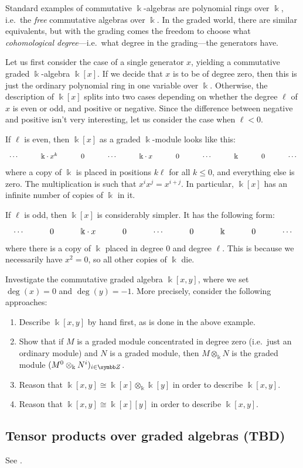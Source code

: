 \begin{example}
	Standard examples of commutative \(\Bbbk\)-algebras are polynomial rings over \(\Bbbk\), i.e.\ the \emph{free} commutative algebras over \(\Bbbk\).
	In the graded world, there are similar equivalents, but with the grading comes the freedom to choose what \emph{cohomological degree}---i.e.\ what degree in the grading---the generators
	have.

	Let us first consider the case of a single generator \(x\), yielding a commutative graded \(\Bbbk\)-algebra \(\Bbbk[x]\). If we decide that \(x\) is to be of degree zero,
	then this is just the ordinary polynomial ring in one variable over \(\Bbbk\). Otherwise, the description of \(\Bbbk[x]\) splits into two cases depending on whether the
	degree \(\ell\) of \(x\) is even or odd, and positive or negative. Since the difference between negative and positive isn't very interesting, let us consider
	the case when \(\ell < 0\).

	If \(\ell\) is even, then \(\Bbbk[x]\) as a graded \(\Bbbk\)-module looks like this:
	\[
	\begin{tikzcd}
		\cdots & \Bbbk \cdot x^{k} & 0 & \cdots & \Bbbk \cdot x & 0 & \cdots & \Bbbk & 0 & \cdots
	\end{tikzcd}
	\]
	where a copy of \(\Bbbk\) is placed in positions \(k\ell\) for all \(k \leq 0\), and everything else is zero. The multiplication is such that \(x^{i}x^j = x^{i+j}\).
	In particular, \(\Bbbk[x]\) has an infinite number of copies of \(\Bbbk\) in it.

	If \(\ell\) is odd, then \(\Bbbk[x]\) is considerably simpler. It has the following form:
	\[
	\begin{tikzcd}
		\cdots & 0 & \Bbbk\cdot x & 0 & \cdots & 0 & \Bbbk & 0 & \cdots
	\end{tikzcd}
	\]
	where there is a copy of \(\Bbbk\) placed in degree 0 and degree \(\ell\). This is because we necessarily have \(x^2 = 0\), so all other copies of \(\Bbbk\) die.
\end{example}
\begin{exercise}
	Investigate the commutative graded algebra \(\Bbbk[x,y]\), where we set \(\deg(x) = 0\) and \(\deg(y)=-1\). More precisely, consider the following approaches:
	\begin{enumerate}[label=(\arabic*)]
		\item Describe \(\Bbbk[x,y]\) by hand first, as is done in the above example.
		\item Show that if \(M\) is a graded module concentrated in degree zero (i.e.\ just an ordinary module) and \(N\) is a graded
		module, then \(M\otimes_\Bbbk N\) is the graded module \((M^0\otimes_\Bbbk N^i)_{i\in\Z}\).
		\item Reason that \(\Bbbk[x,y] \cong \Bbbk[x]\otimes_\Bbbk\Bbbk[y]\) in order to describe \(\Bbbk[x,y]\).
		\item Reason that \(\Bbbk[x,y] \cong \Bbbk[x][y]\) in order to describe \(\Bbbk[x,y]\).
	\end{enumerate}
\end{exercise}

\subsection{Tensor products over graded algebras (TBD)}
See \cite[Lemma 3.1.30]{doi:10.1017/9781108292825}.
